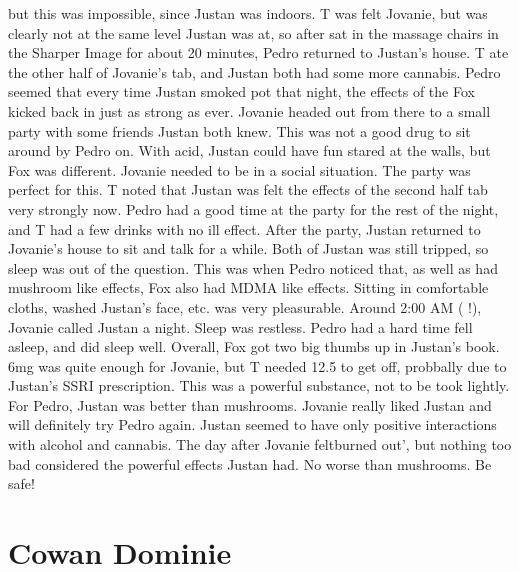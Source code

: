 \documentclass[12pt]{book}
\begin{document}
but this was impossible, since Justan was indoors. T was felt Jovanie, but was clearly not at the same level Justan was at, so after sat in the massage chairs in the Sharper Image for about 20 minutes, Pedro returned to Justan's house. T ate the other half of Jovanie's tab, and Justan both had some more cannabis. Pedro seemed that every time Justan smoked pot that night, the effects of the Fox kicked back in just as strong as ever. Jovanie headed out from there to a small party with some friends Justan both knew. This was not a good drug to sit around by Pedro on. With acid, Justan could have fun stared at the walls, but Fox was different. Jovanie needed to be in a social situation. The party was perfect for this. T noted that Justan was felt the effects of the second half tab very strongly now. Pedro had a good time at the party for the rest of the night, and T had a few drinks with no ill effect. After the party, Justan returned to Jovanie's house to sit and talk for a while. Both of Justan was still tripped, so sleep was out of the question. This was when Pedro noticed that, as well as had mushroom like effects, Fox also had MDMA like effects. Sitting in comfortable cloths, washed Justan's face, etc. was very pleasurable. Around 2:00 AM ( !), Jovanie called Justan a night. Sleep was restless. Pedro had a hard time fell asleep, and did sleep well. Overall, Fox got two big thumbs up in Justan's book. 6mg was quite enough for Jovanie, but T needed 12.5 to get off, probbally due to Justan's SSRI prescription. This was a powerful substance, not to be took lightly. For Pedro, Justan was better than mushrooms. Jovanie really liked Justan and will definitely try Pedro again. Justan seemed to have only positive interactions with alcohol and cannabis. The day after Jovanie feltburned out', but nothing too bad considered the powerful effects Justan had. No worse than mushrooms. Be safe!



\chapter{Cowan Dominie}
\end{document}
